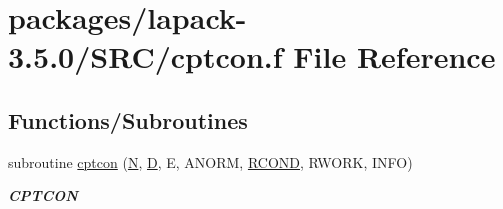 \hypertarget{cptcon_8f}{}\section{packages/lapack-\/3.5.0/\+S\+R\+C/cptcon.f File Reference}
\label{cptcon_8f}
\subsection*{Functions/\+Subroutines}
\begin{DoxyCompactItemize}
\item 
subroutine \hyperlink{group__complexPTcomputational_ga4e9b4c5682a455e0c1a60ca3166a050c}{cptcon} (\hyperlink{polmisc_8c_a0240ac851181b84ac374872dc5434ee4}{N}, \hyperlink{odrpack_8h_a7dae6ea403d00f3687f24a874e67d139}{D}, E, A\+N\+O\+R\+M, \hyperlink{superlu__enum__consts_8h_af00a42ecad444bbda75cde1b64bd7e72a9b5c151728d8512307565994c89919d5}{R\+C\+O\+N\+D}, R\+W\+O\+R\+K, I\+N\+F\+O)
\begin{DoxyCompactList}\small\item\em {\bfseries C\+P\+T\+C\+O\+N} \end{DoxyCompactList}\end{DoxyCompactItemize}
